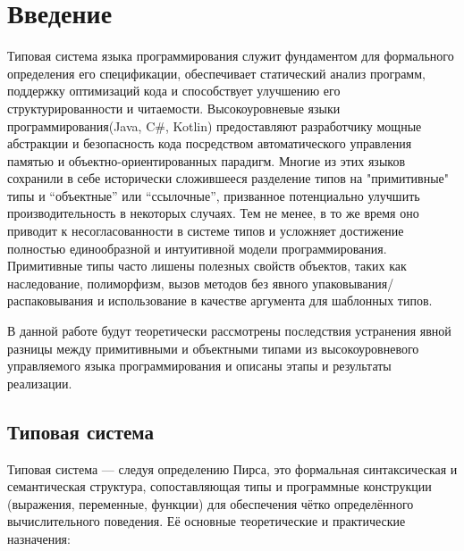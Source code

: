 \section{Введение}
\label{sec:Chapter0} 
\onehalfspacing %

Типовая система языка программирования служит фундаментом для формального определения его спецификации, обеспечивает статический анализ программ,
поддержку оптимизаций кода и способствует улучшению его структурированности и читаемости.
Высокоуровневые языки программирования(Java, C\#, Kotlin) предоставляют разработчику мощные абстракции и безопасность кода посредством автоматического
управления памятью и объектно-ориентированных парадигм. Многие из этих языков сохранили в себе исторически сложившееся разделение типов на "примитивные" типы и ``объектные''
или ``ссылочные'', призванное потенциально улучшить производительность в некоторых случаях. Тем не менее, в то же время оно приводит к несогласованности в системе типов и
усложняет достижение полностью единообразной и интуитивной модели программирования. Примитивные типы часто лишены полезных свойств объектов, таких как наследование,
полиморфизм, вызов методов без явного упаковывания/распаковывания и использование в качестве аргумента для шаблонных типов.

В данной работе будут теоретически рассмотрены последствия устранения явной разницы между примитивными и объектными типами из высокоуровневого управляемого языка
программирования и описаны этапы и результаты реализации.

\subsection{Типовая система}

Типовая система — следуя определению Пирса\cite{pierce2002}, это формальная синтаксическая и семантическая структура, сопоставляющая типы и программные конструкции (выражения, переменные, функции) для обеспечения чётко определённого вычислительного поведения. Её основные теоретические и практические назначения:

